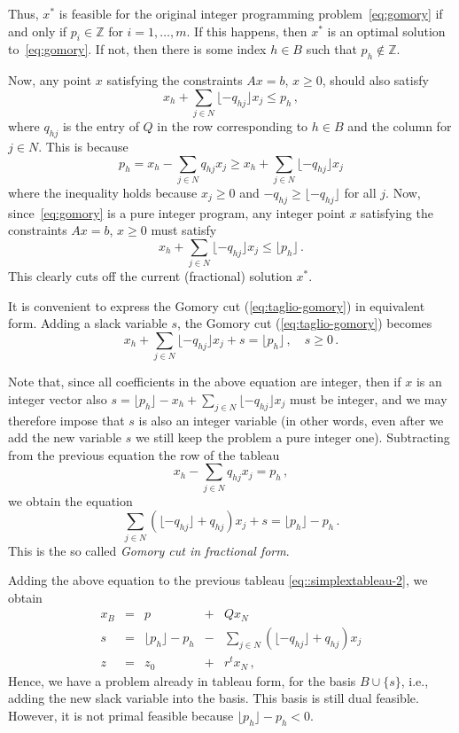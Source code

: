 \documentclass[12pt, showidx, twoside]{article}
\def\Z{\mathbb{Z}}
\begin{document}
{{Thus, $x^*$ is feasible for the original integer programming problem~\eqref{eq:gomory} if and only if $p_i\in\Z$ for $i=1,\ldots, m$. If this happens, then $x^*$ is an optimal solution to~\eqref{eq:gomory}.
If not, then there is some index  $h\in B$ such that $p_h\notin\Z$.


Now, any point $x$ satisfying the constraints $Ax=b$, $x\geq 0$, should also satisfy
$$x_{h}+\sum_{j\in N}\lfloor -q_{hj}\rfloor x_j\leq p_h\, ,$$
where $q_{hj}$ is the entry of $Q$ in the row corresponding to $h\in B$ and the column for $j\in N$. This is because
$$p_h = x_h - \sum_{j\in N}q_{hj}x_j\geq x_{h}+\sum_{j\in N}\lfloor -q_{hj}\rfloor x_j$$
where the inequality holds because  $x_j\geq 0$ and $-q_{hj}\geq \lfloor -q_{hj}\rfloor$ for all $j$.
Now, since~\eqref{eq:gomory} is a pure integer program, any integer point $x$ satisfying the constraints $Ax=b$, $x\geq 0$ must satisfy
\begin{equation}\label{eq:taglio-gomory} x_{h}+\sum_{j\in N}\lfloor -q_{hj}\rfloor x_j\leq \lfloor p_h\rfloor\, .\end{equation}
This clearly cuts off the current 
(fractional) solution $x^*$.
\bigskip

It is convenient to express the Gomory cut (\ref{eq:taglio-gomory}) in equivalent form. Adding a slack variable $s$, the Gomory cut (\ref{eq:taglio-gomory}) becomes
$$x_{h}+\sum_{j\in N}\lfloor -q_{hj}\rfloor x_j+s= \lfloor p_h\rfloor\, ,\quad s\geq 0\, .$$

Note that, since all coefficients in the above equation are integer, then if  $x$ is an integer vector also $s=\lfloor p_h\rfloor-x_{h}+\sum_{j\in N}\lfloor -q_{hj}\rfloor x_j$ must be integer, and we may therefore impose that $s$ is also an integer variable (in other words, even after we add the new variable $s$ we still keep the problem a pure integer one).
Subtracting from the previous equation the row of the tableau $$ x_{h}-\sum_{j\in N} q_{hj} x_j=  p_h\, ,$$ we obtain the equation
$$\sum_{j\in N}(\lfloor -q_{hj}\rfloor +q_{hj})x_j+s=\lfloor{p_h}\rfloor-p_h\, .$$
This is the so called {\em Gomory cut in fractional form}.

Adding the above equation to the previous tableau \eqref{eq::simplextableau-2}, we obtain 
\begin{equation} \label{eq::simplextableau-3}
\begin{array}{lclcc}
x_B & = & p   & + & Q x_N\\
s&=&\lfloor{p_h}\rfloor-p_h&-&\sum_{j\in N}(\lfloor -q_{hj}\rfloor +q_{hj})x_j\\ \hline
z   & = & z_0 & + &r^t x_N\, ,
\end{array}
\end{equation} 
Hence, we have a problem already in tableau form, for the basis $B\cup\{s\}$, i.e., adding the new slack variable into the basis. This basis is still dual feasible. However, it is not primal feasible because $\lfloor{p_h}\rfloor-p_h<0$.


}}
\end{document}

